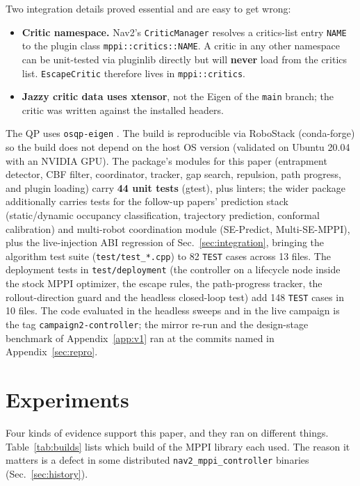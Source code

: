 \documentclass[journal]{IEEEtran}
\begin{document}
Two integration details proved essential and are easy to get wrong:
\begin{itemize}
\item \textbf{Critic namespace.} Nav2's \texttt{CriticManager} resolves a
  critics-list entry \texttt{NAME} to the plugin class
  \texttt{mppi::critics::NAME}. A critic in any other namespace can be
  unit-tested via pluginlib directly but will \textbf{never} load from
  the critics list. \texttt{EscapeCritic} therefore lives in
  \texttt{mppi::critics}.
\item \textbf{Jazzy critic data uses xtensor}, not the Eigen of the
  \texttt{main} branch; the critic was written against the installed
  headers.
\end{itemize}

The QP uses \texttt{osqp-eigen} \cite{osqp}. The build is reproducible via
RoboStack (conda-forge) so the build does not depend on the host OS version
(validated on Ubuntu 20.04 with an NVIDIA GPU). The package's modules for this paper (entrapment detector, CBF filter,
coordinator, tracker, gap search, repulsion, path progress, and plugin
loading) carry \textbf{44 unit tests} (gtest), plus linters; the wider package
additionally carries tests for the follow-up papers' prediction stack
(static/dynamic occupancy classification, trajectory prediction, conformal
calibration) and multi-robot coordination module (SE-Predict,
Multi-SE-MPPI), plus the live-injection ABI regression of
Sec.~\ref{sec:integration}, bringing the algorithm test suite
(\texttt{test/test\_*.cpp}) to 82 \texttt{TEST} cases across 13 files. The
deployment tests in \texttt{test/deployment} (the controller on a lifecycle
node inside the stock MPPI optimizer, the escape rules, the path-progress
tracker, the rollout-direction guard and the headless closed-loop test)
add 148 \texttt{TEST} cases in 10 files. The code evaluated in the headless
sweeps and in the live campaign is the tag \texttt{campaign2-controller}; the
mirror re-run and the design-stage benchmark of Appendix~\ref{app:v1} ran at
the commits named in Appendix~\ref{sec:repro}.

\section{Experiments}
\label{sec:experiments}

Four kinds of evidence support this paper, and they ran on different
things. Table~\ref{tab:builds} lists which build of the MPPI library
each used. The reason it matters is a defect in some distributed
\texttt{nav2\_mppi\_controller} binaries (Sec.~\ref{sec:history}).
\end{document}
